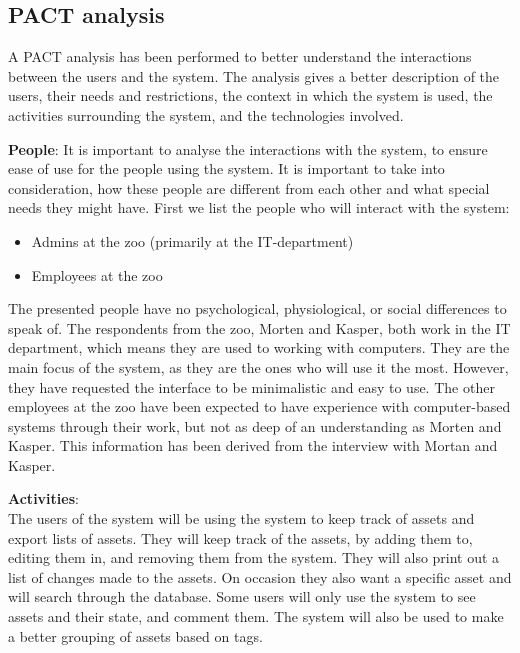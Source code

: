 \subsection{PACT analysis}\label{ssc:PACT}
A PACT analysis \cite[chap 2]{DEB} has been performed to better understand the interactions between the users and the system. The analysis gives a better description of the users, their needs and restrictions, the context in which the system is used, the activities surrounding the system, and the technologies involved.

\textbf{People}:
It is important to analyse the interactions with the system, to ensure ease of use for the people using the system. It is important to take into consideration, how these people are different from each other and what special needs they might have. First we list the people who will interact with the system:

\begin{itemize}
    \setlength\itemsep{0.05em}
    \item Admins at the zoo (primarily at the IT-department)
    \item Employees at the zoo
\end{itemize}

The presented people have no psychological, physiological, or social differences to speak of. The respondents from the zoo, Morten and Kasper, both work in the IT department, which means they are used to working with computers. They are the main focus of the system, as they are the ones who will use it the most. However, they have requested the interface to be minimalistic and easy to use. The other employees at the zoo have been expected to have experience with computer-based systems through their work, but not as deep of an understanding as Morten and Kasper. This information has been derived from the interview with Mortan and Kasper.
\par

\textbf{Activities}: \\
The users of the system will be using the system to keep track of assets and export lists of assets. They will keep track of the assets, by adding them to, editing them in, and removing them from the system. They will also print out a list of changes made to the assets. On occasion they also want a specific asset and will search through the database. Some users will only use the system to see assets and their state, and comment them. The system will also be used to make a better grouping of assets based on tags.
\par

